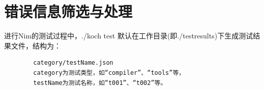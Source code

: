 \documentclass[UTF8]{ctexart}
\begin{document}
\section{错误信息筛选与处理} %
	进行Nim的测试过程中，./koch test 默认在工作目录(即./testresults)下生成测试结果文件，结构为：
	\begin{center}
	\begin{tcolorbox}[colback=gray!20, colframe=gray!20, rounded corners, boxrule=-5pt, height=0.06\textheight, width=0.62\textwidth, left=0pt, right=0pt, top=0pt, bottom=0pt]
		\begin{verbatim}
		category/testName.json
		category为测试类型，如“compiler”、“tools”等，
		testName为测试名称，如“t001”、“t002”等。
		\end{verbatim}
	\end{tcolorbox}
	\end{center}
\end{document}
